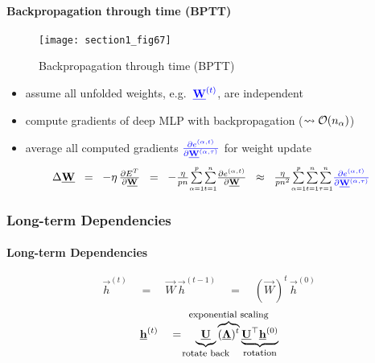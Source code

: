 \paragraph{Backpropagation through time (BPTT)}
\begin{figure}
	\centering
	\texttt{[image: section1\_fig67]}
	\caption{Backpropagation through time (BPTT)}\label{fig:rnn_bptt}
\end{figure}
\begin{itemize}
		\item assume all unfolded weights, 
				e.g.~$\color{blue}\vec W^{(t)}$, are independent
		\item compute gradients of deep MLP with backpropagation 
				($\leadsto \Set O(n_\alpha)$)
		\item average all computed gradients 
				${\color{blue} \frac{\partial e^{(\alpha,t)}}%
				{\partial \vec W^{(\alpha,\tau)}}}$ 
				for weight update
			$$ \hspace{-5mm}
				\Delta \vec W \;\; = \;\;
					-\eta \, \smallfrac{\partial E^T}{\partial \vec W}
				\;\;=\;\; -\smallfrac{\eta}{pn} 
					\smallsum{\alpha=1}{p} \smallsum{t=1}{n}
					\smallfrac{\partial e^{(\alpha, t)}}{\partial \vec W}
				\;\;\approx\;\; \smallfrac{\eta}{pn^2}
					\smallsum{\alpha=1}{p} \smallsum{t=1}{n} \smallsum{\tau=1}{n}
					{\color{blue} \smallfrac{\partial e^{(\alpha,t)}}%
						{\partial \vec W^{(\alpha,\tau)}}}
			$$
	\end{itemize}
\subsubsection{Long-term Dependencies}

\paragraph{Long-term Dependencies}
	\vspace{1mm}
\begin{equation}
	\vec h^{(t)} 
	\quad = \quad \vec W \, \vec h^{(t-1)}
	\quad=\quad (\vec W)^t \, \vec h^{(0)}
\end{equation}
\begin{equation}
\vec h^{(t)} \quad =\quad 
			\underbrace{\vec U
			}_{\kern-3ex\text{\footnotesize rotate back}\kern-3ex}
			\overbrace{(\vec \Lambda)^t
			}^{\kern-6ex\text{\footnotesize exponential scaling}\kern-6ex}
			\underbrace{\vec U^\top \vec h^{(0)}
			}_{\text{\footnotesize rotation}}
\end{equation}
